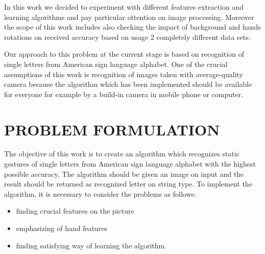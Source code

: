 \documentclass[11pt,a4paper]{article}
\begin{document}
	In this work we decided to experiment with different features extraction and learning algorithms and pay particular attention on image processing. Moreover the scope of this work includes also checking the impact of background and hands rotations on received accuracy based on usage 2 completely different data sets.
	
	Our approach to this problem at the current stage is based on recognition of single letters from American sign language alphabet. One of the crucial assumptions of this work is recognition of images taken with average-quality camera because the algorithm which has been implemented should be available for everyone for example by a build-in camera in mobile phone or computer.
	
	
	
	
	

	

\section{PROBLEM FORMULATION}

	The objective of this work is to create an algorithm which recognizes static gestures of single letters from American sign language alphabet with the highest possible accuracy. The algorithm should be given an image on input and the result should be returned as recognized letter on string type. To implement the algorithm, it is necessary to consider the problems as follows:
\begin{itemize}	
\item finding crucial features on the picture

\item emphasizing of hand features
	
\item  finding satisfying way of learning the algorithm.
\end{itemize}







\end{document}

